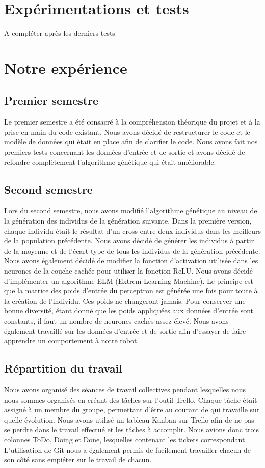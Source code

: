\documentclass[12pt]{article}
\begin{document}
\newpage

\section{Expérimentations et tests}
A compléter après les derniers tests

\newpage

\section{Notre expérience}

\subsection{Premier semestre}
Le premier semestre a été consacré à la compréhension théorique du projet et à la prise en main du code existant. Nous avons décidé de restructurer le code et le modèle de données qui était en place afin de clarifier le code. Nous avons fait nos premiers tests concernant les données d'entrée et de sortie et avons décidé de refondre complètement l'algorithme génétique qui était améliorable.


\subsection{Second semestre}
Lors du second semestre, nous avons modifié l'algorithme génétique au niveau de la génération des individus de la génération suivante. Dans la première version, chaque individu était le résultat d'un cross entre deux individus dans les meilleurs de la population précédente. Nous avons décidé de générer les individus à partir de la moyenne et de l'écart-type de tous les individus de la génération précédente. Nous avons également décidé de modifier la fonction d'activation utilisée dans les neurones de la couche cachée pour utiliser la fonction ReLU. Nous avons décidé d'implémenter un algorithme ELM (Extrem Learning Machine). Le principe est que la matrice des poids d'entrée du perceptron est générée une fois pour toute à la création de l'individu. Ces poids ne changeront jamais. Pour conserver une bonne diversité, étant donné que les poids appliquées aux données d'entrée sont constants, il faut un nombre de neurones cachés assez élevé. Nous avons également travaillé sur les données d'entrée et de sortie afin d'essayer de faire apprendre un comportement à notre robot.

\subsection{Répartition du travail}
Nous avons organisé des séances de travail collectives pendant lesquelles nous nous sommes organisés en créant des tâches sur l'outil Trello. Chaque tâche était assigné à un membre du groupe, permettant d'être au courant de qui travaille sur quelle évolution. Nous avons utilisé un tableau Kanban sur Trello afin de ne pas se perdre dans le travail effectué et les tâches à accomplir. Nous avions donc trois colonnes ToDo, Doing et Done, lesquelles contenant les tickets correspondant. L'utilisation de Git nous a également permis de facilement travailler chacun de son côté sans empiéter sur le travail de chacun.
\end{document}
